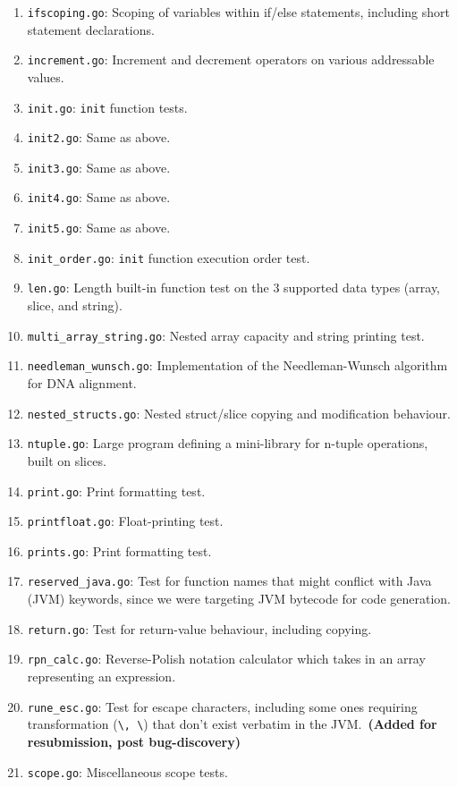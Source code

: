 \documentclass[11pt]{article}
\begin{document}
\begin{enumerate}
\item \texttt{ifscoping.go}: Scoping of variables within if/else statements, including short statement declarations.
\item \texttt{increment.go}: Increment and decrement operators on various addressable values.
\item \texttt{init.go}: \texttt{init} function tests.
\item \texttt{init2.go}: Same as above.
\item \texttt{init3.go}: Same as above.
\item \texttt{init4.go}: Same as above.
\item \texttt{init5.go}: Same as above.
\item \texttt{init\_order.go}: \texttt{init} function execution order test.
\item \texttt{len.go}: Length built-in function test on the 3 supported data types (array, slice, and string).
\item \texttt{multi\_array\_string.go}: Nested array capacity and string printing test.
\item \texttt{needleman\_wunsch.go}: Implementation of the Needleman-Wunsch algorithm for DNA alignment.
\item \texttt{nested\_structs.go}: Nested struct/slice copying and modification behaviour.
\item \texttt{ntuple.go}: Large program defining a mini-library for n-tuple operations, built on slices.
\item \texttt{print.go}: Print formatting test.
\item \texttt{printfloat.go}: Float-printing test.
\item \texttt{prints.go}: Print formatting test.
\item \texttt{reserved\_java.go}: Test for function names that might conflict with Java (JVM) keywords, since we were targeting JVM bytecode for code generation.
\item \texttt{return.go}: Test for return-value behaviour, including copying.
\item \texttt{rpn\_calc.go}: Reverse-Polish notation calculator which takes in an array representing an expression.
\item \texttt{rune\_esc.go}: Test for escape characters, including some ones requiring transformation (\texttt{\textbackslash\@a, \textbackslash\@v}) that don't exist
      verbatim in the JVM.~\textbf{(Added for resubmission, post bug-discovery)}
\item \texttt{scope.go}: Miscellaneous scope tests.

\end{enumerate}
\end{document}
